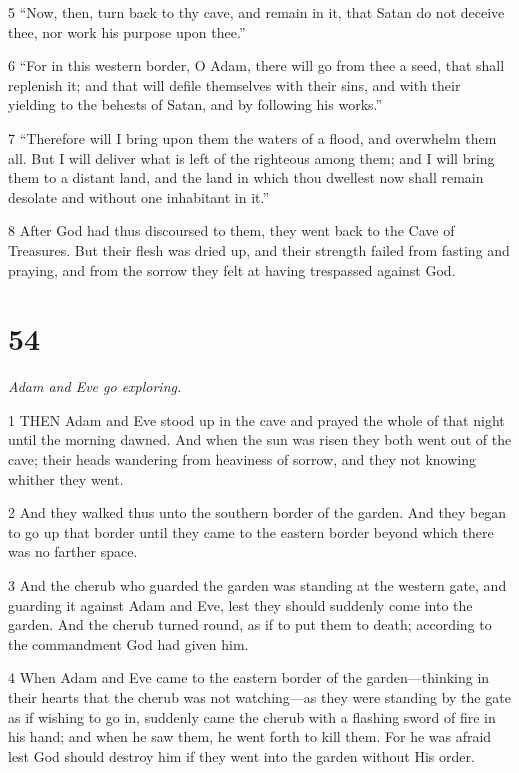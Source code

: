 \par 5 “Now, then, turn back to thy cave, and remain in it, that Satan do not deceive thee, nor work his purpose upon thee.”

\par 6 “For in this western border, O Adam, there will go from thee a seed, that shall replenish it; and that will defile themselves with their sins, and with their yielding to the behests of Satan, and by following his works.”

\par 7 “Therefore will I bring upon them the waters of a flood, and overwhelm them all. But I will deliver what is left of the righteous among them; and I will bring them to a distant land, and the land in which thou dwellest now shall remain desolate and without one inhabitant in it.”

\par 8 After God had thus discoursed to them, they went back to the Cave of Treasures. But their flesh was dried up, and their strength failed from fasting and praying, and from the sorrow they felt at having trespassed against God.

\chapter{54}

\par \textit{Adam and Eve go exploring.}

\par 1 THEN Adam and Eve stood up in the cave and prayed the whole of that night until the morning dawned. And when the sun was risen they both went out of the cave; their heads wandering from heaviness of sorrow, and they not knowing whither they went.

\par 2 And they walked thus unto the southern border of the garden. And they began to go up that border until they came to the eastern border beyond which there was no farther space.

\par 3 And the cherub who guarded the garden was standing at the western gate, and guarding it against Adam and Eve, lest they should suddenly come into the garden. And the cherub turned round, as if to put them to death; according to the commandment God had given him.

\par 4 When Adam and Eve came to the eastern border of the garden—thinking in their hearts that the cherub was not watching—as they were standing by the gate as if wishing to go in, suddenly came the cherub with a flashing sword of fire in his hand; and when he saw them, he went forth to kill them. For he was afraid lest God should destroy him if they went into the garden without His order.

